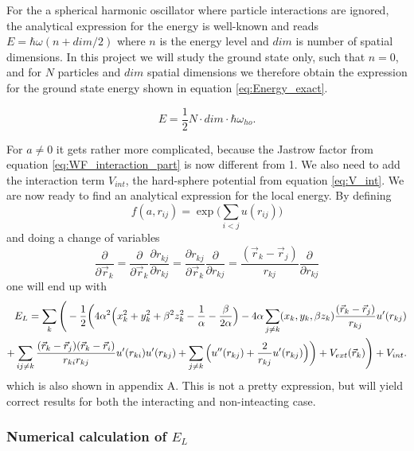 \documentclass[norsk,a4paper,12pt]{article}
\begin{document}
For the a spherical harmonic oscillator where particle interactions are ignored, the analytical expression for the energy is well-known and reads $E = \hbar\omega(n + dim/2)$ where $n$ is the energy level and $dim$ is number of spatial dimensions. In this project we will study the ground state only, such that $n=0$, and for $N$ particles and $dim$ spatial dimensions we therefore obtain the expression for the ground state energy shown in equation \ref{eq:Energy_exact}.

\begin{equation}
E = \frac{1}{2}N\cdot dim\cdot\hbar\omega_{ho}.
\label{eq:Energy_exact}
\end{equation}


For $a\neq0$ it gets rather more complicated, because the Jastrow factor from equation \ref{eq:WF_interaction_part} is now different from 1. We also need to add the interaction term $V_{int}$, the hard-sphere potential from equation \ref{eq:V_int}. We are now ready to find an analytical expression for the local energy. By defining
\begin{equation}
f(a, r_{ij})=\exp{\bigg(\sum_{i<j}u(r_{ij})\bigg)}
\end{equation}
and doing a change of variables
\begin{equation}
\frac{\partial}{\partial \vec{r}_k}=\frac{\partial}{\partial \vec{r}_k}\frac{\partial r_{kj}}{\partial r_{kj}}=\frac{\partial r_{kj}}{\partial \vec{r}_k}\frac{\partial}{\partial r_{kj}}=\frac{(\vec{r}_k-\vec{r}_j)}{r_{kj}}\frac{\partial}{\partial r_{kj}}
\end{equation}
one will end up with
\begin{align}
E_L=\sum_k\Bigg(-\frac{1}{2}\bigg(4\alpha^2\Big(x_k^2+y_k^2+\beta^2z_k^2-\frac{1}{\alpha}-\frac{\beta}{2\alpha}\Big)
-4\alpha\sum_{j\neq k}(x_k, y_k, \beta z_k)\frac{(\vec{r}_k-\vec{r}_j)}{r_{kj}}u'(r_{kj})\notag\\
+\sum_{ij\neq k}\frac{(\vec{r}_k-\vec{r}_j)(\vec{r}_k-\vec{r}_i)}{r_{ki}r_{kj}}u'(r_{ki})u'(r_{kj})
+\sum_{j\neq k}\Big(u''(r_{kj})+\frac{2}{r_{kj}}u'(r_{kj})\Big)\bigg)+V_{ext}(\vec{r}_k)\Bigg) + V_{int}.\notag
\label{EL_total}
\end{align}
which is also shown in appendix A. This is not a pretty expression, but will yield correct results for both the interacting and non-inteacting case.



\subsubsection{Numerical calculation of $E_L$} \label{Numerical_calc_E_L}
\end{document}
